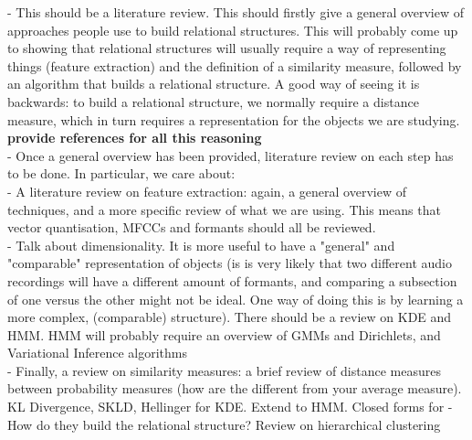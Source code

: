 \documentclass[../main.tex]{subfiles}
\begin{document}
- This should be a literature review. This should firstly give a general overview of approaches people use to build relational structures. This will probably come up to showing that relational structures will usually require a way of representing things (feature extraction) and the definition of a similarity measure, followed by an algorithm that builds a relational structure. A good way of seeing it is backwards: to build a relational structure, we normally require a distance measure, which in turn requires a representation for the objects we are studying. \textbf{provide references for all this reasoning}\\
- Once a general overview has been provided, literature review on each step has to be done. In particular, we care about:\\
- A literature review on feature extraction: again, a general overview of techniques, and a more specific review of what we are using. This means that vector quantisation, MFCCs and formants should all be reviewed.\\
- Talk about dimensionality. It is more useful to have a "general" and "comparable" representation of objects (is is very likely that two different audio recordings will have a different amount of formants, and comparing a subsection of one versus the other might not be ideal. One way of doing this is by learning a more complex, (comparable) structure). There should be a review on KDE and HMM. HMM will probably require an overview of GMMs and Dirichlets, and Variational Inference algorithms\\
- Finally, a review on similarity measures: a brief review of distance measures between probability measures (how are the different from your average measure). KL Divergence, SKLD, Hellinger for KDE. Extend to HMM. Closed forms for 
- How do they build the relational structure? Review on hierarchical clustering
\end{document}
